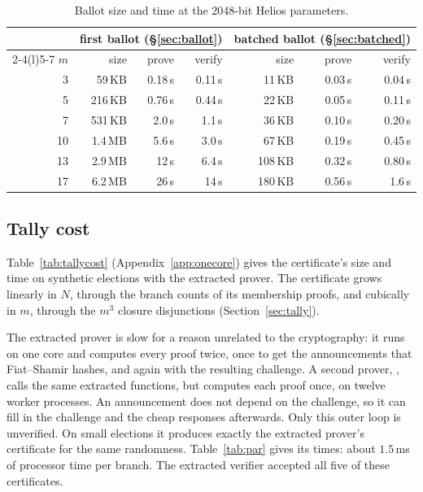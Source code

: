 \begin{table}[t]
  \caption{Ballot size and time at the 2048-bit Helios parameters.}
  \label{tab:ballotcost}
  \centering\scriptsize\setlength{\tabcolsep}{4pt}
  \begin{tabular}{@{}rrrrrrr@{}}
    \toprule
    & \multicolumn{3}{c}{first ballot (\S\ref{sec:ballot})} & \multicolumn{3}{c}{batched ballot (\S\ref{sec:batched})} \\
    \cmidrule(lr){2-4}\cmidrule(l){5-7}
    $m$ & size & prove & verify & size & prove & verify \\
    \midrule
    3 & 59\,KB & 0.18\,s & 0.11\,s & 11\,KB & 0.03\,s & 0.04\,s \\
    5 & 216\,KB & 0.76\,s & 0.44\,s & 22\,KB & 0.05\,s & 0.11\,s \\
    7 & 531\,KB & 2.0\,s & 1.1\,s & 36\,KB & 0.10\,s & 0.20\,s \\
    10 & 1.4\,MB & 5.6\,s & 3.0\,s & 67\,KB & 0.19\,s & 0.45\,s \\
    13 & 2.9\,MB & 12\,s & 6.4\,s & 108\,KB & 0.32\,s & 0.80\,s \\
    17 & 6.2\,MB & 26\,s & 14\,s & 180\,KB & 0.56\,s & 1.6\,s \\
    \bottomrule
  \end{tabular}
\end{table}

\subsection{Tally cost}\label{sec:eval:tally}
Table~\ref{tab:tallycost} (Appendix~\ref{app:onecore}) gives the
certificate's size and time on synthetic elections with the extracted
prover. The certificate grows linearly in $N$, through the
branch counts of its membership proofs, and cubically in $m$, through the
$m^3$ closure disjunctions (Section~\ref{sec:tally}). 

The extracted prover is slow for a reason unrelated to the
cryptography: it runs on one core and computes every proof twice, once
to get the announcements that Fiat--Shamir hashes, and again with the
resulting challenge. A second prover,
, calls the
same extracted functions, but computes each proof once, on twelve
worker processes. An announcement does not depend on the challenge, so
it can fill in the challenge and the cheap responses afterwards. Only
this outer loop is unverified. On small elections it produces exactly
the extracted prover's certificate for the same randomness.
Table~\ref{tab:par} gives its times: about $1.5$\,ms of processor time per
branch. The extracted verifier accepted all five of these certificates.

